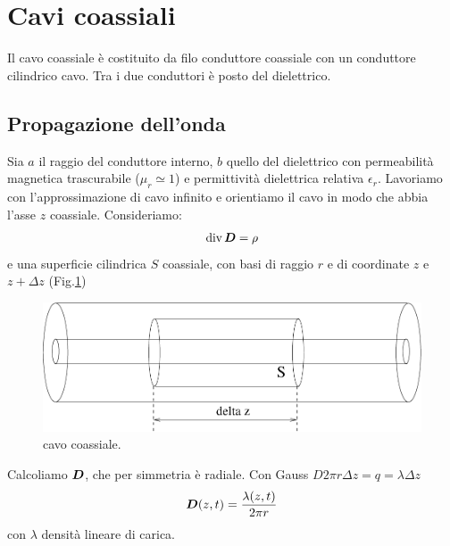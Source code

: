 \section{Cavi coassiali}
Il cavo coassiale è costituito da filo conduttore coassiale con un conduttore cilindrico cavo. Tra i due conduttori è posto del dielettrico.
\subsection{Propagazione dell'onda}
Sia $a$ il raggio del conduttore interno, $b$ quello del dielettrico con permeabilità magnetica trascurabile ($\mu_r\simeq 1$) e permittività dielettrica relativa $\epsilon_r$. Lavoriamo con l'approssimazione di cavo infinito e orientiamo il cavo in modo che abbia l'asse $z$ coassiale. Consideriamo:
\begin{equation}
  \operatorname{div}\boldsymbol{D}=\rho
\end{equation}
e una superficie cilindrica $S$ coassiale, con basi di raggio $r$ e di coordinate $z$ e $z+\Delta z$ (Fig.\ref{coassiali_01})
\begin{figure}[htbp]
  \centering
  \includegraphics[scale=0.5]{immagini/fisica2/coassiali_01}
  \caption{cavo coassiale.}
  \label{coassiali_01}
\end{figure}
Calcoliamo $\boldsymbol{D}$, che per simmetria è radiale. Con Gauss $D2\pi r\Delta z=q=\lambda\Delta z$
\begin{equation}
  \boldsymbol{D}(z,t)=\frac{\lambda(z,t)}{2\pi r}
  \label{lambda_coa}
\end{equation}
con $\lambda$ densità lineare di carica.

